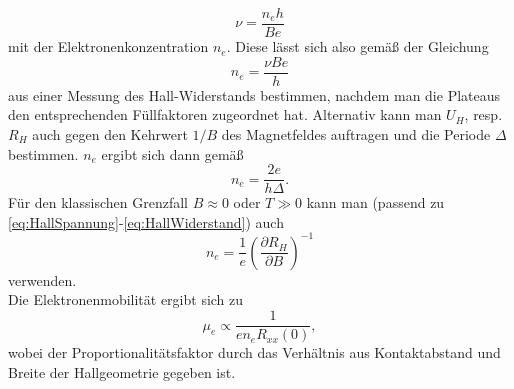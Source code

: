 \begin{equation}\label{eq:Fuellfaktor}
\nu = \frac{n_eh}{Be}
\end{equation}
mit der Elektronenkonzentration $n_e$. Diese lässt sich also gemäß der Gleichung
\begin{equation}\label{eq:ElektrKonz1}
n_e = \frac{\nu Be}{h}
\end{equation}
aus einer Messung des Hall-Widerstands bestimmen, nachdem man die Plateaus den entsprechenden Füllfaktoren zugeordnet hat.
Alternativ kann man $U_H$, resp. $R_H$ auch gegen den Kehrwert $1/B$ des Magnetfeldes auftragen und die Periode
$\Delta$ bestimmen. $n_e$ ergibt sich dann gemäß
\begin{equation}\label{eq:ElektrKonz2}
n_e = \frac{2e}{h\Delta}.
\end{equation}
Für den klassischen Grenzfall $B\approx 0$ oder $T\gg0$ kann man (passend zu \eqref{eq:HallSpannung}-\eqref{eq:HallWiderstand}) auch
\begin{equation}\label{eq:ElektrKonz3}
n_e = \frac{1}{e}\left(\frac{\partial R_H}{\partial B}\right)^{-1}
\end{equation}
verwenden.\\
Die Elektronenmobilität ergibt sich zu
\begin{equation}\label{eq:Mobilitaet}
\mu_e \propto \frac{1}{e n_eR_{xx}(0)},
\end{equation}
wobei der Proportionalitätsfaktor durch das Verhältnis aus Kontaktabstand und Breite der Hallgeometrie gegeben ist.
\nocite{qhe}
\nocite{wiki-fg}
\nocite{wiki-he}
